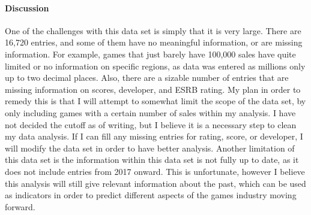 \documentclass[12pt]{article}
\begin{document}
\paragraph{Discussion}
One of the challenges with this data set is simply that it is very large. There are 16,720 entries, and some of them have no meaningful 
information, or are missing information. For example, games that just barely have 100,000 sales have quite limited or no information on 
specific regions, as data was entered as millions only up to two decimal places. Also, there are a sizable number of entries that are 
missing information on scores, developer, and ESRB rating. My plan in order to remedy this is that I will attempt to somewhat limit the 
scope of the data set, by only including games with a certain number of sales within my analysis. I have not decided the cutoff as of 
writing, but I believe it is a necessary step to clean my data analysis. If I can fill any missing entries for rating, score, or 
developer, I will modify the data set in order to have better analysis. Another limitation of this data set is the information within 
this data set is not fully up to date, as it does not include entries from 2017 onward. This is unfortunate, however I believe this 
analysis will still give relevant information about the past, which can be used as indicators in order to predict different aspects 
of the games industry moving forward. 




\end{document}
